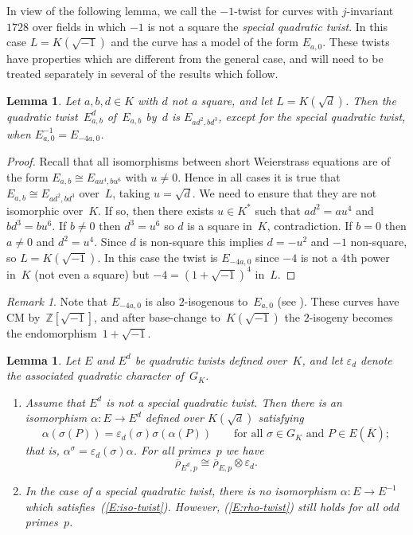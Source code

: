 \documentclass[12pt, reqno]{amsart}
\newcommand{\Z}{\mathbb{Z}}
\newcommand{\Kbar}{{\overline{K}}}
\newcommand{\rhobar}{{\overline{\rho}}}
\newcommand{\eps}{\varepsilon}
\numberwithin{equation}{section}
\newtheorem{lemma}[theorem]{Lemma}
\theoremstyle{definition}
\theoremstyle{remark}
\newtheorem{remark}[theorem]{Remark}
\begin{document}
In view of the following lemma, we call the $-1$-twist for curves with
$j$-invariant~$1728$ over fields in which $-1$ is not a square the
\emph{special quadratic twist}. In this case $L=K(\sqrt{-1})$ and the
curve has a model of the form $E_{a,0}$.  These twists have properties
which are different from the general case, and will need to be treated
separately in several of the results which follow.

\begin{lemma}\label{L:quadratic-twist} Let $a, b , d\in K$ with $d$ not a square,  and
let $L=K(\sqrt{d})$. Then the quadratic twist~$E_{a,b}^d$ of~$E_{a,b}$
by~$d$ is $E_{ad^2,bd^3}$, except for the special quadratic twist,
when $E_{a,0}^{-1}=E_{-4a,0}$.
\end{lemma}
\begin{proof}
Recall that all isomorphisms between short Weierstrass equations are
of the form $E_{a,b}\cong E_{au^4,bu^6}$ with $u\not=0$.  Hence in all
cases it is true that $E_{a,b}\cong E_{ad^2,bd^3}$ over~$L$, taking
$u=\sqrt{d}$. We need to ensure that they are not isomorphic over~$K$.
If so, then there exists $u\in K^*$ such that $ad^2=au^4$ and
$bd^3=bu^6$.  If $b\not=0$ then $d^3=u^6$ so $d$ is a square in~$K$,
contradiction.  If $b=0$ then $a\not=0$ and $d^2=u^4$.  Since $d$ is
non-square this implies $d=-u^2$ and $-1$ non-square, so
$L=K(\sqrt{-1})$.  In this case the twist is $E_{-4a,0}$ since $-4$ is
not a $4$th power in~$K$ (not even a square) but $-4=(1+\sqrt{-1})^4$
in~$L$.
\end{proof}

\begin{remark}\label{R:2-isog}
Note that $E_{-4a,0}$ is also $2$-isogenous to~$E_{a,0}$ (see
\cite[p. 336]{SilvermanI}).  These curves have CM by~$\Z[\sqrt{-1}]$,
and after base-change to~$K(\sqrt{-1})$ the $2$-isogeny becomes the
endomorphism~$1+\sqrt{-1}$.
\end{remark}

\begin{lemma}\label{L:twist-rep}
Let $E$ and $E^d$ be quadratic twists defined over~$K$, and let
$\eps_d$ denote the associated quadratic character of~$G_K$.
\begin{enumerate}
\item Assume that $E^d$ is not a special quadratic twist.  Then there
  is an isomorphism $\alpha:E\to E^d$ defined over $K(\sqrt{d})$
  satisfying
\begin{equation}\label{E:iso-twist}
\alpha(\sigma(P)) = \eps_d(\sigma)\sigma(\alpha(P))\qquad\text{for
  all~$\sigma\in G_K$ and $P\in E(\Kbar)$};
\end{equation}
that is, $\alpha^{\sigma} = \eps_d(\sigma)\alpha$.  For all primes~$p$ we have
\begin{equation} \label{E:rho-twist}
  \rhobar_{E^d,p} \cong \rhobar_{E,p}\otimes\eps_d.
\end{equation}
\item
  In the case of a special quadratic twist, there is no isomorphism
  $\alpha: E\to E^{-1}$ which satisfies~(\ref{E:iso-twist}).  However,
  (\ref{E:rho-twist}) still holds for all \emph{odd} primes~$p$.
\end{enumerate}
\end{lemma}
\end{document}
